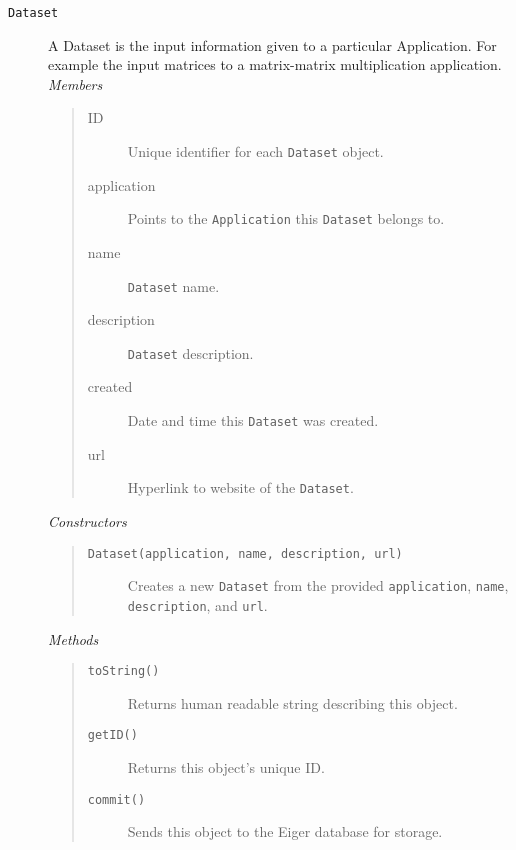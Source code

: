 \begin{description}
\item[\texttt{Dataset}] A Dataset is the input information given to a particular Application.
  For example the input matrices to a matrix-matrix multiplication application.
  {\em Members}
	\begin{quote}
	\begin{description}
    \item[ID] Unique identifier for each \texttt{Dataset} object.
    \item[application] Points to the \texttt{Application} this \texttt{Dataset} belongs to.
    \item[name] \texttt{Dataset} name. 
    \item[description] \texttt{Dataset} description.
    \item[created] Date and time this \texttt{Dataset} was created.
    \item[url] Hyperlink to website of the \texttt{Dataset}.
	\end{description}
	\end{quote}
  {\em Constructors}
	\begin{quote}
	\begin{description}
    \item[\texttt{Dataset(application, name, description, url)}] Creates a new \texttt{Dataset} from the provided \texttt{application}, \texttt{name}, \texttt{description}, and \texttt{url}.
	\end{description}
	\end{quote}
	{\em Methods}
	\begin{quote}
	\begin{description}
		\item[\texttt{toString()}] Returns human readable string describing this object.
		\item[\texttt{getID()}] Returns this object's unique ID.
	\item[\texttt{commit()}] Sends this object to the Eiger database for storage.
	\end{description}
	\end{quote}


\end{description}
